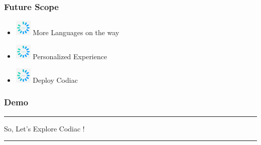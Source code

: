 \documentclass[14pt]{beamer}
\begin{document}
\begin{frame}
    \frametitle{Future Scope}
	\noindent                                                                                                       {\color{pink} \rule{\linewidth}{0.7mm}} 
         \begin{itemize}
 \item [] \includegraphics[width=0.3in, height=0.3in]{./logos/loading.jpg} More Languages on the way\\
     \pause
 \item [] \includegraphics[width=0.3in, height=0.3in]{./logos/loading.jpg} Personalized Experience \\
     \pause
 \item [] \includegraphics[width=0.3in, height=0.3in]{./logos/loading.jpg} Deploy Codiac\\
 \end{itemize}
\noindent{	
	   \color{pink} \rule{\linewidth}{0.7mm} }   	
\end{frame}	


\begin{frame}
	\frametitle{Demo}
    {\color{dr} \rule{\linewidth}{0.7mm}}
    \linebreak
    \linebreak
    \centerline
    {\huge \color{dr}
   So, Let's Explore Codiac !}
    \linebreak

    {\color{dr} \rule{\linewidth}{0.7mm}}
\end{frame}
\end{document}
